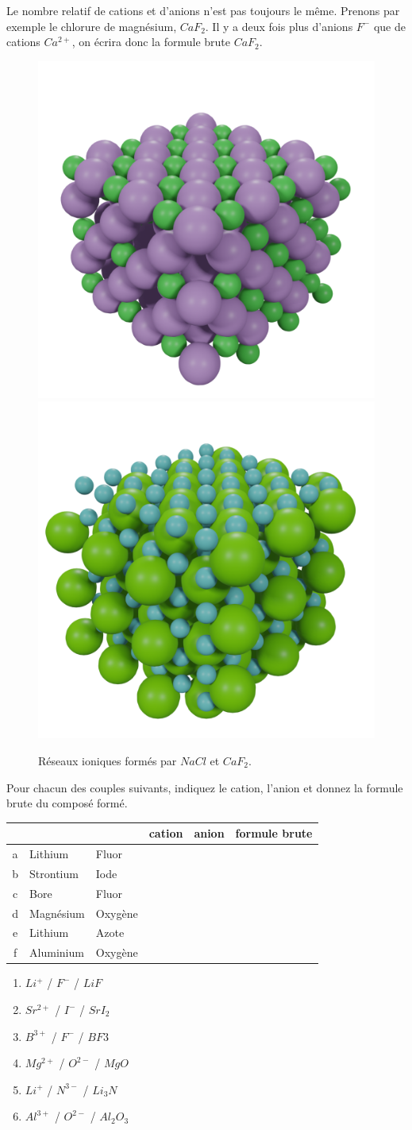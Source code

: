 \documentclass[
  11pt,
  french,
  a4paper,
  openany]{book}
\begin{document}
Le nombre relatif de cations et d'anions n'est pas toujours le même. Prenons par exemple le chlorure de magnésium, \(CaF_2\). Il y a deux fois plus d'anions \(F^-\) que de cations \(Ca^{2+}\), on écrira donc la formule brute \(CaF_2\).

\begin{figure}

{\centering \includegraphics[width=0.25\linewidth]{images/NaCl-crystal} \includegraphics[width=0.25\linewidth]{images/CaF2-crystal} 

}

\caption{Réseaux ioniques formés par $NaCl$ et $CaF_2$.}\label{fig:NaClCaF2}
\end{figure}

\begin{Exercise}
Pour chacun des couples suivants, indiquez le cation, l'anion et donnez la formule brute du composé formé.

\end{Exercise}

\begin{longtable}[]{@{}cllccc@{}}
\toprule
~ & ~ & ~ & cation & anion & formule brute\tabularnewline
\midrule
\endhead
a & Lithium & Fluor & & &\tabularnewline
b & Strontium & Iode & & &\tabularnewline
c & Bore & Fluor & & &\tabularnewline
d & Magnésium & Oxygène & & &\tabularnewline
e & Lithium & Azote & & &\tabularnewline
f & Aluminium & Oxygène & & &\tabularnewline
\bottomrule
\end{longtable}

\begin{Answer}

\begin{enumerate}
\def\labelenumi{\alph{enumi}.}
\item
  \(Li^+\) / \(F^-\) / \(LiF\)
\item
  \(Sr^{2+}\) / \(I^{-}\) / \(SrI_2\)
\item
  \(B^{3+}\) / \(F^-\) / \(BF3\)
\item
  \(Mg^{2+}\) / \(O^{2-}\) / \(MgO\)
\item
  \(Li^+\) / \(N^{3-}\) / \(Li_3N\)
\item
  \(Al^{3+}\) / \(O^{2-}\) / \(Al_2O_3\)
\end{enumerate}


\end{Answer}
\end{document}
